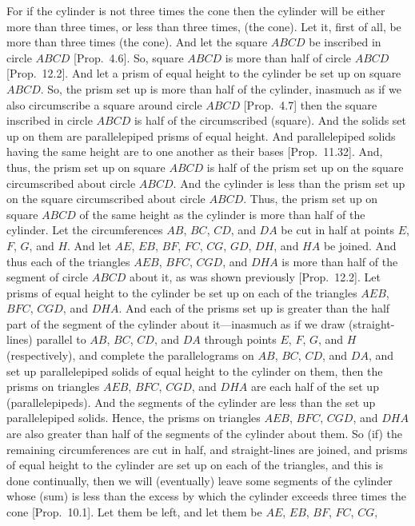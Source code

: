 \begin{Parallel}{}{}
{For if the cylinder is not three times the cone then the cylinder will be either more than three times, or less than three times, (the cone). Let it, first
of all, be  more than three times (the cone). And  let the square $ABCD$ be inscribed in circle $ABCD$ [Prop.~4.6].
So, square $ABCD$ is more than half of circle $ABCD$  [Prop.~12.2]. And let a prism
of equal height to the cylinder be set up on square $ABCD$. So, the prism set up is more than half of the
cylinder, inasmuch as  if we also circumscribe a square around circle $ABCD$ [Prop.~4.7] then the square inscribed in circle $ABCD$ is half of the circumscribed (square). And the  solids  set up on them are parallelepiped
prisms  of equal height.  And parallelepiped solids having the same height are to one
another as their bases [Prop.~11.32]. And, thus, the prism set up on square $ABCD$ is half
of the prism set up on the square circumscribed about circle $ABCD$. And the cylinder is less than the prism
set up on the square circumscribed about circle $ABCD$. Thus, the prism set up on square $ABCD$ of the
same height as the cylinder is more than half of the cylinder. Let the circumferences $AB$, $BC$, $CD$, and $DA$
be cut in half at points $E$, $F$, $G$, and $H$. And let $AE$, $EB$, $BF$, $FC$, $CG$, $GD$, $DH$,
and $HA$ be joined. And thus each of the triangles $AEB$, $BFC$, $CGD$, and $DHA$ is more than
half of the segment of circle $ABCD$ about it, as was shown previously [Prop.~12.2].
Let prisms of equal height to the cylinder be set up on each of the triangles $AEB$, $BFC$, $CGD$,
and $DHA$.  And each of the prisms set up is greater than the half part of the segment of the cylinder about it---inasmuch
as if we  draw (straight-lines) parallel to $AB$, $BC$, $CD$, and $DA$ through points $E$, $F$, $G$, and $H$
(respectively), and complete the parallelograms on $AB$, $BC$, $CD$, and $DA$, and set up parallelepiped solids
of equal height to the cylinder on them, then the prisms on triangles $AEB$, $BFC$, $CGD$, and $DHA$ are each half
of the set up (parallelepipeds). And the segments of the cylinder are less than the set up parallelepiped solids. 
Hence, the prisms on triangles $AEB$, $BFC$, $CGD$, and $DHA$ are also greater than half of the segments
of the cylinder about them. So (if) the remaining circumferences are cut in half, and straight-lines are joined,
and prisms of equal height to the cylinder are set up on each of the triangles, and this is done
continually,  then we will (eventually) leave some segments of the cylinder whose (sum) is less than the excess by which the
cylinder exceeds three times the cone [Prop.~10.1]. Let them be left, and let them be $AE$, $EB$, $BF$, $FC$, $CG$,
}
\end{Parallel}
